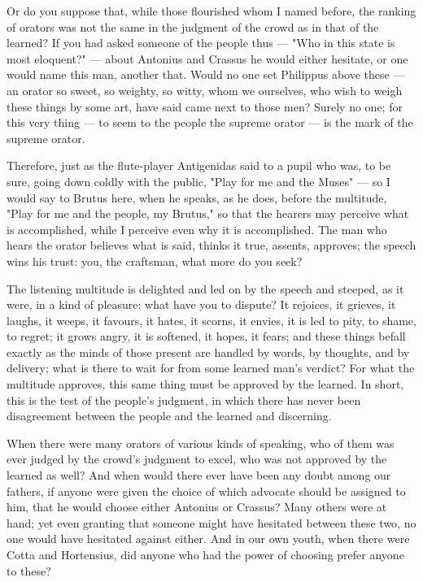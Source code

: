  Or do you suppose that, while those flourished whom I named before, the ranking of orators was not the same in the judgment of the crowd as in that of the learned? If you had asked someone of the people thus — "Who in this state is most eloquent?" — about Antonius and Crassus he would either hesitate, or one would name this man, another that. Would no one set Philippus above these — an orator so sweet, so weighty, so witty, whom we ourselves, who wish to weigh these things by some art, have said came next to those men? Surely no one; for this very thing — to seem to the people the supreme orator — is the mark of the supreme orator.

 Therefore, just as the flute-player Antigenidas said to a pupil who was, to be sure, going down coldly with the public, "Play for me and the Muses" — so I would say to Brutus here, when he speaks, as he does, before the multitude, "Play for me and the people, my Brutus," so that the hearers may perceive what is accomplished, while I perceive even why it is accomplished. The man who hears the orator believes what is said, thinks it true, assents, approves; the speech wins his trust: you, the craftsman, what more do you seek?

 The listening multitude is delighted and led on by the speech and steeped, as it were, in a kind of pleasure: what have you to dispute? It rejoices, it grieves, it laughs, it weeps, it favours, it hates, it scorns, it envies, it is led to pity, to shame, to regret; it grows angry, it is softened, it hopes, it fears; and these things befall exactly as the minds of those present are handled by words, by thoughts, and by delivery; what is there to wait for from some learned man's verdict? For what the multitude approves, this same thing must be approved by the learned. In short, this is the test of the people's judgment, in which there has never been disagreement between the people and the learned and discerning.

 When there were many orators of various kinds of speaking, who of them was ever judged by the crowd's judgment to excel, who was not approved by the learned as well? And when would there ever have been any doubt among our fathers, if anyone were given the choice of which advocate should be assigned to him, that he would choose either Antonius or Crassus? Many others were at hand; yet even granting that someone might have hesitated between these two, no one would have hesitated against either. And in our own youth, when there were Cotta and Hortensius, did anyone who had the power of choosing prefer anyone to these?

